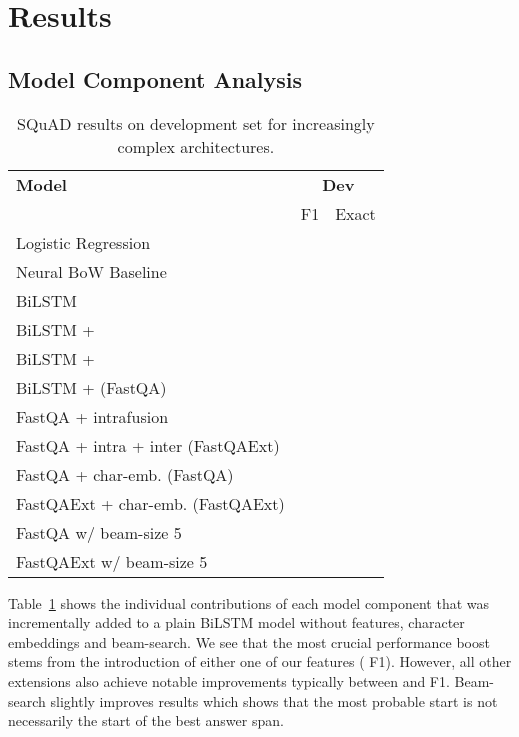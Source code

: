 \documentclass[11pt,a4paper]{article}
\begin{document}
\section{Results}


\subsection{Model Component Analysis}

\begin{table}[h]
    \centering
    \small
    \begin{tabular}{l c c}
        \toprule
        \textbf{Model} & \multicolumn{2}{c}{\textbf{Dev}} \\
        & F1 & Exact \\
        \midrule
        Logistic Regression &  &   \\
        \midrule
        Neural BoW Baseline &  &  \\
        \midrule
        BiLSTM &  &  \\
        BiLSTM +  &  &  \\
        BiLSTM +  &  &  \\
        BiLSTM +  (FastQA) &  &  \\
        \midrule
        FastQA + intrafusion &  &  \\
        FastQA + intra + inter (FastQAExt) &  &  \\
        \midrule
        FastQA + char-emb. (FastQA) &  &  \\
        FastQAExt + char-emb. (FastQAExt) &  &  \\
        \midrule
        FastQA w/ beam-size 5 &  &  \\
        FastQAExt w/ beam-size 5 &  &  \\
        \bottomrule
    \end{tabular}
    \caption{SQuAD results on development set for increasingly complex architectures. }
    \label{tab:squad_dev_results}
\end{table}

Table~\ref{tab:squad_dev_results} shows the individual contributions of each model component that was incrementally added to a plain BiLSTM model without features, character embeddings and beam-search. We see that the most crucial performance boost stems from the introduction of either one of our features ( F1). However, all other extensions also achieve notable improvements typically between  and  F1. Beam-search slightly improves results which shows that the most probable start is not necessarily the start of the best answer span.
\end{document}
